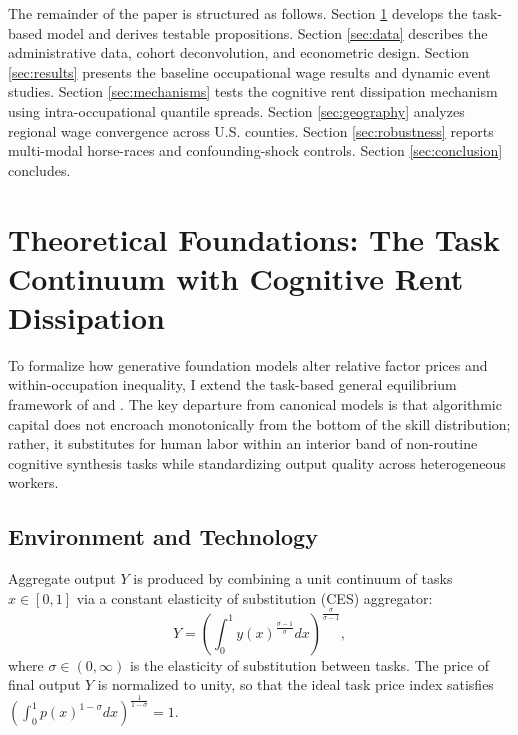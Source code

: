\documentclass[12pt]{article}
\begin{document}
The remainder of the paper is structured as follows. Section \ref{sec:theory} develops the task-based model and derives testable propositions. Section \ref{sec:data} describes the administrative data, cohort deconvolution, and econometric design. Section \ref{sec:results} presents the baseline occupational wage results and dynamic event studies. Section \ref{sec:mechanisms} tests the cognitive rent dissipation mechanism using intra-occupational quantile spreads. Section \ref{sec:geography} analyzes regional wage convergence across U.S. counties. Section \ref{sec:robustness} reports multi-modal horse-races and confounding-shock controls. Section \ref{sec:conclusion} concludes.

\section{Theoretical Foundations: The Task Continuum with Cognitive Rent Dissipation}
\label{sec:theory}

To formalize how generative foundation models alter relative factor prices and within-occupation inequality, I extend the task-based general equilibrium framework of \citet{acemogluAutor2011} and \citet{acemogluRestrepo2018, acemogluRestrepo2022}. The key departure from canonical models is that algorithmic capital does not encroach monotonically from the bottom of the skill distribution; rather, it substitutes for human labor within an interior band of non-routine cognitive synthesis tasks while standardizing output quality across heterogeneous workers.

\subsection{Environment and Technology}

Aggregate output $Y$ is produced by combining a unit continuum of tasks $x \in [0, 1]$ via a constant elasticity of substitution (CES) aggregator:
\begin{equation}
\label{eq:ces_production}
Y = \left( \int_0^1 y(x)^{\frac{\sigma - 1}{\sigma}} dx \right)^{\frac{\sigma}{\sigma - 1}},
\end{equation}
where $\sigma \in (0, \infty)$ is the elasticity of substitution between tasks. The price of final output $Y$ is normalized to unity, so that the ideal task price index satisfies $\left( \int_0^1 p(x)^{1 - \sigma} dx \right)^{\frac{1}{1 - \sigma}} = 1$.
\end{document}
